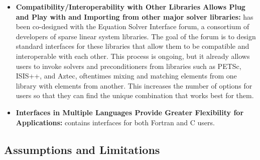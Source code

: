 \begin{itemize}
\item
{\bf Compatibility/Interoperability with Other Libraries Allows Plug and Play with
and Importing from 
other major solver libraries:} \hypre{} has been co-designed with the Equation
Solver Interface forum, a 
consortium of developers of sparse linear system libraries. The goal of the
forum is to design standard 
interfaces for these libraries that allow them to be compatible and
interoperable with each other. This 
process is ongoing, but it already allows \hypre{} users to invoke solvers and
preconditioners from libraries 
such as PETSc, ISIS++, and Aztec, oftentimes mixing and matching elements from
one library with 
elements from another. This increases the number of options for users so
that they can find the unique 
combination that works best for them.

\item
{\bf Interfaces in Multiple Languages Provide Greater Flexibility for Applications:}
\hypre{} contains 
interfaces for both Fortran and C users.

\end{itemize}

\subsection{Assumptions and Limitations}


